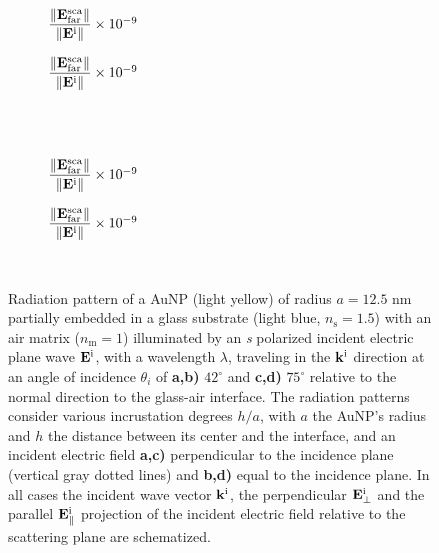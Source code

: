 \begin{figure}[h!]
    \centering
    \def\svgwidth{.8\textwidth}
    \hspace*{-.2\textwidth}%
    \vspace*{-3.85em}%
        \begin{subfigure}{.4\textwidth}\caption{%
                    \footnotesize$\dfrac{\norm{\vb{E}^\text{sca}_\text{far}}}{\norm{\vb{E}^\text{i}}} \times 10^{-9}$  }\label{sfig:Far:Inc:s:a}\end{subfigure}%
        \begin{subfigure}{.4\textwidth}\caption{%
                    \footnotesize$\dfrac{\norm{\vb{E}^\text{sca}_\text{far}}}{\norm{\vb{E}^\text{i}}} \times 10^{-9}$  }\label{sfig:Far:Inc:s:b}\end{subfigure}\\
    \\[-.75em]
    \def\svgwidth{.8\textwidth}
    \hspace*{-.21\textwidth}%
    \vspace*{-.85em}%
        \begin{subfigure}{.4\textwidth}\caption{%
                    \footnotesize$\dfrac{\norm{\vb{E}^\text{sca}_\text{far}}}{\norm{\vb{E}^\text{i}}} \times 10^{-9}$  }\label{sfig:Far:Inc:s:c}\end{subfigure}%
        \begin{subfigure}{.4\textwidth}\caption{%
                    \footnotesize$\dfrac{\norm{\vb{E}^\text{sca}_\text{far}}}{\norm{\vb{E}^\text{i}}} \times 10^{-9}$  }\label{sfig:Far:Inc:s:d}\end{subfigure}\\
    \caption[  Radiation pattern of a AuNP supported on a substrate illuminated at oblique incidence ]{%
    Radiation pattern of a AuNP (light yellow) of radius $a = 12.5$ nm partially embedded in a glass substrate (light blue, $n_\text{s} = 1.5$) with an air matrix ($n_\text{m} = 1$) illuminated by an \textit{s} polarized incident electric plane wave $\vb{E}^\text{i}$, with a wavelength $\lambda$, traveling in the $\vb{k}^\text{i}$ direction at an angle of incidence $\theta_i$ of \textbf{a,b)} $42^\circ$ and \textbf{c,d)} $75^\circ$ relative to the normal direction to the glass-air interface. The radiation patterns consider various incrustation degrees $h/a$, with $a$ the AuNP's radius and $h$ the distance between its center and the interface, and an  incident electric field \textbf{a,c)} perpendicular to the incidence plane (vertical gray dotted lines) and \textbf{b,d)} equal to the incidence plane. In all cases the incident wave vector $\vb{k}^\text{i}$, the perpendicular $\vb{E}_\perp^\text{i}$ and the  parallel $\vb{E}_\parallel^\text{i}$ projection of the incident electric field relative to the scattering plane are schematized.%
     }
    \label{fig:Far:Inc:s}
\end{figure}


